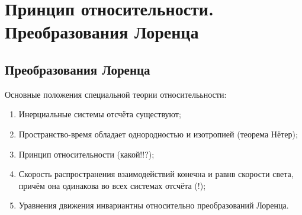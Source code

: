 \newpage
\section{Принцип относительности. Преобразования Лоренца}
\subsection{Преобразования Лоренца}

Основные положения специальной теории относителььности:
\begin{enumerate}
    \item Инерциальные системы отсчёта существуют;
    \item Пространство-время обладает однородностью и изотропией (теорема Нётер);
    \item Принцип относительности (какой!!?);
    \item Скорость распространения взаимодействий конечна и равнв скорости света, причём она одинакова во всех системах отсчёта (!);
    \item Уравнения движения инвариантны относительно преобразований Лоренца.
\end{enumerate}

